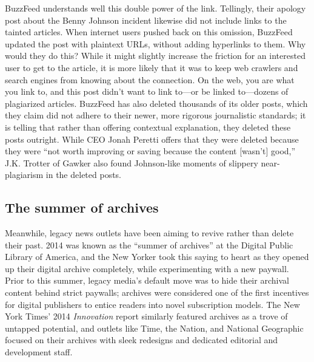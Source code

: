 BuzzFeed understands well this double power of the link. Tellingly, their apology post about the Benny Johnson incident likewise did not include links to the tainted articles. When internet users pushed back on this omission, BuzzFeed updated the post with plaintext URLs, without adding hyperlinks to them.\autocite{smith_editors_2014} Why would they do this? While it might slightly increase the friction for an interested user to get to the article, it is more likely that it was to keep web crawlers and search engines from knowing about the connection. On the web, you are what you link to, and this post didn't want to link to---or be linked to---dozens of plagiarized articles. BuzzFeed has also deleted thousands of its older posts, which they claim did not adhere to their newer, more rigorous journalistic standards; it is telling that rather than offering contextual explanation, they deleted these posts outright. While CEO Jonah Peretti offers that they were deleted because they were ``not worth improving or saving because the content [wasn't] good,'' J.K. Trotter of Gawker also found Johnson-like moments of slippery near-plagiarism in the deleted posts.\autocites{trotter_over_2014}{trotter_dont_2014}


\subsection{The summer of archives}

Meanwhile, legacy news outlets have been aiming to revive rather than delete their past. 2014 was known as the ``summer of archives'' at the Digital Public Library of America, and the New Yorker took this saying to heart as they opened up their digital archive completely, while experimenting with a new paywall. Prior to this summer, legacy media's default move was to hide their archival content behind strict paywalls; archives were considered one of the first incentives for digital publishers to entice readers into novel subscription models. The New York Times' 2014 \emph{Innovation} report similarly featured archives as a trove of untapped potential, and outlets like Time, the Nation, and National Geographic focused on their archives with sleek redesigns and dedicated editorial and development staff.

